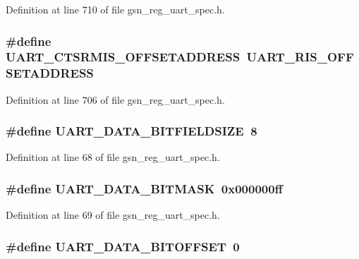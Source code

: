 Definition at line 710 of file gsn\_\-reg\_\-uart\_\-spec.h.

\hypertarget{a00575_a6d0473288b62692d9760b4379e4f886b}{
\subsubsection[{UART\_\-CTSRMIS\_\-OFFSETADDRESS}]{\setlength{\rightskip}{0pt plus 5cm}\#define UART\_\-CTSRMIS\_\-OFFSETADDRESS~UART\_\-RIS\_\-OFFSETADDRESS}}
\label{a00575_a6d0473288b62692d9760b4379e4f886b}


Definition at line 706 of file gsn\_\-reg\_\-uart\_\-spec.h.

\hypertarget{a00575_a518e330590e2db2a261952e0dc2b00e6}{
\subsubsection[{UART\_\-DATA\_\-BITFIELDSIZE}]{\setlength{\rightskip}{0pt plus 5cm}\#define UART\_\-DATA\_\-BITFIELDSIZE~8}}
\label{a00575_a518e330590e2db2a261952e0dc2b00e6}


Definition at line 68 of file gsn\_\-reg\_\-uart\_\-spec.h.

\hypertarget{a00575_a0096631c3ca5c4026998e2055a1260e5}{
\subsubsection[{UART\_\-DATA\_\-BITMASK}]{\setlength{\rightskip}{0pt plus 5cm}\#define UART\_\-DATA\_\-BITMASK~0x000000ff}}
\label{a00575_a0096631c3ca5c4026998e2055a1260e5}


Definition at line 69 of file gsn\_\-reg\_\-uart\_\-spec.h.

\hypertarget{a00575_a059b89ab1631fee4ae2bc20cfec83402}{
\subsubsection[{UART\_\-DATA\_\-BITOFFSET}]{\setlength{\rightskip}{0pt plus 5cm}\#define UART\_\-DATA\_\-BITOFFSET~0}}
\label{a00575_a059b89ab1631fee4ae2bc20cfec83402}


